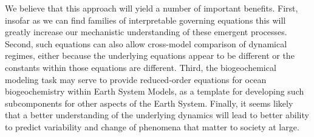 \documentclass{article}
\begin{document}
We believe that this approach will yield a number of important benefits. First, insofar as we can find families of interpretable governing equations this will greatly increase our mechanistic understanding of these emergent processes. Second, such equations can also allow cross-model comparison of dynamical regimes, either because the underlying equations appear to be different or the constants within those equations are different. Third, the biogeochemical modeling task may serve to provide reduced-order equations for ocean biogeochemistry within Earth System Models, as a template for developing such subcomponents for other aspects of the Earth System. Finally, it seems likely that a better understanding of the underlying dynamics will lead to better ability to predict variability and change of phenomena that matter to society at large.



\end{document}
